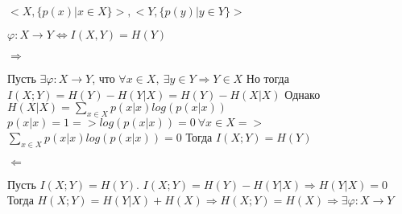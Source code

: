 \documentclass[../main.tex]{subfiles}
\begin{document}
$<X, \{p(x)|x \in X\}>, <Y, \{p(y)|y \in Y\}>$

$\varphi: X \rightarrow Y \Leftrightarrow I(X,Y) = H(Y)$

$\Rightarrow$

\noindent Пусть $\exists \varphi : X \rightarrow Y$, что $\forall x \in X, \ \exists y \in Y \Rightarrow Y \in X$
Но тогда $I(X;Y) = H(Y)-H(Y|X)=H(Y)-H(X|X)$ \newline
Однако $H(X|X) = \sum\limits_{x \in X} p(x|x)log(p(x|x))$ 
$p(x|x) = 1 => log(p(x|x))=0\ \forall x \in X =>$ $\sum\limits_{x \in X} p(x|x)log(p(x|x)) = 0$ \newline
Тогда $I(X;Y) = H(Y)$

$\Leftarrow$ 

\noindent Пусть $I(X;Y) = H(Y)$. $I(X;Y) = H(Y) - H(Y|X) \Rightarrow H(Y|X) = 0$ \newline
Тогда $H(X;Y) = H(Y|X) + H(X) \Rightarrow H(X;Y) = H(X) \Rightarrow \exists \varphi :X\rightarrow Y$
\end{document}
